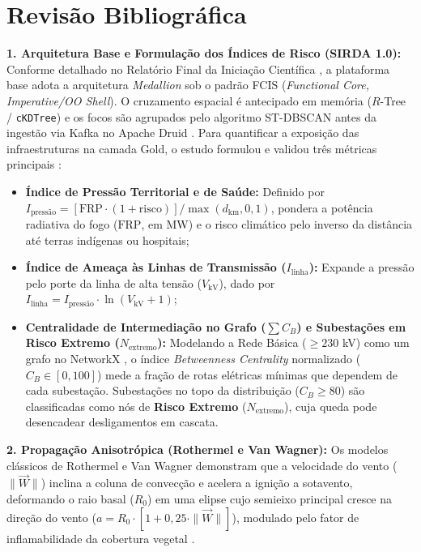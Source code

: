 \section{Revisão Bibliográfica}
\label{sc:revisao}

\textbf{1. Arquitetura Base e Formulação dos Índices de Risco (SIRDA 1.0):} Conforme detalhado no Relatório Final da Iniciação Científica \cite{sampaio2026ic}, a plataforma base adota a arquitetura \textit{Medallion} sob o padrão FCIS (\textit{Functional Core, Imperative/OO Shell}). O cruzamento espacial é antecipado em memória ($R$-Tree / \texttt{cKDTree}) e os focos são agrupados pelo algoritmo ST-DBSCAN antes da ingestão via Kafka no Apache Druid \cite{yang2014druid}. Para quantificar a exposição das infraestruturas na camada Gold, o estudo formulou e validou três métricas principais \cite{sampaio2026ic}:
\begin{itemize}
    \item \textbf{Índice de Pressão Territorial e de Saúde:} Definido por $I_{\text{pressão}} = [\text{FRP} \cdot (1 + \text{risco})] / \max(d_{\text{km}}, 0{,}1)$, pondera a potência radiativa do fogo ($\text{FRP}$, em MW) e o risco climático pelo inverso da distância até terras indígenas ou hospitais;
    \item \textbf{Índice de Ameaça às Linhas de Transmissão ($I_{\text{linha}}$):} Expande a pressão pelo porte da linha de alta tensão ($V_{\text{kV}}$), dado por $I_{\text{linha}} = I_{\text{pressão}} \cdot \ln(V_{\text{kV}} + 1)$;
    \item \textbf{Centralidade de Intermediação no Grafo ($\sum C_B$) e Subestações em Risco Extremo ($N_{\text{extremo}}$):} Modelando a Rede Básica ($\ge 230$ kV) como um grafo no NetworkX \cite{hagberg2008exploring}, o índice \textit{Betweenness Centrality} normalizado ($C_B \in [0, 100]$) mede a fração de rotas elétricas mínimas que dependem de cada subestação. Subestações no topo da distribuição ($C_B \ge 80$) são classificadas como nós de \textbf{Risco Extremo} ($N_{\text{extremo}}$), cuja queda pode desencadear desligamentos em cascata.
\end{itemize}

\textbf{2. Propagação Anisotrópica (Rothermel e Van Wagner):} Os modelos clássicos de Rothermel \cite{rothermel1972mathematical} e Van Wagner \cite{vanwagner1969combined} demonstram que a velocidade do vento ($\|\vec{W}\|$) inclina a coluna de convecção e acelera a ignição a sotavento, deformando o raio basal ($R_0$) em uma elipse cujo semieixo principal cresce na direção do vento ($a = R_0 \cdot [1 + 0{,}25 \cdot \|\vec{W}\|]$), modulado pelo fator de inflamabilidade da cobertura vegetal \cite{mapbiomas2026fogo}.


